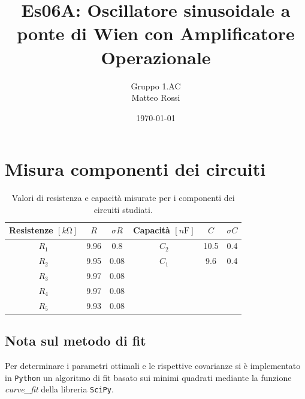 \documentclass[10pt, a4paper, italian]{article}
\author{Gruppo 1.AC \\ Matteo Rossi}
\title{Es06A: Oscillatore sinusoidale a ponte di Wien con Amplificatore Operazionale}
\begin{document}
\date{\today}
\maketitle

\setcounter{section}{0}

\section*{Misura componenti dei circuiti}
\begin{table}[htbp]
\centering
\begin{tabular}{cccccc}
\toprule
Resistenze $[\si{k\ohm}]$ & $R$ & $\sigma R$ & Capacità $[\si{n\F}]$ & $C$ &
$\sigma C$ \\
\midrule
\midrule
$R_1$	  & 9.96 	& 0.8 	 & $C_2$ & 10.5		 & 0.4 \\
$R_2$	  & 9.95	& 0.08 	 & $C_1$ & 9.6		 & 0.4 \\
$R_3$	  & 9.97	& 0.08	 & & & \\
$R_4$	  & 9.97	& 0.08	 & & & \\
$R_5$	  & 9.93	& 0.08	 & & & \\
\bottomrule     
\end{tabular}
\caption{Valori di resistenza e capacità misurate per i componenti dei
circuiti studiati. \label{tab: rcmes}}
\end{table}

\subsection*{Nota sul metodo di fit}
Per determinare i parametri ottimali e le rispettive covarianze si \`e
implementato in \verb+Python+ un algoritmo di fit basato sui minimi quadrati
mediante la funzione \emph{curve\_fit} della libreria \texttt{SciPy}.

\end{document}
